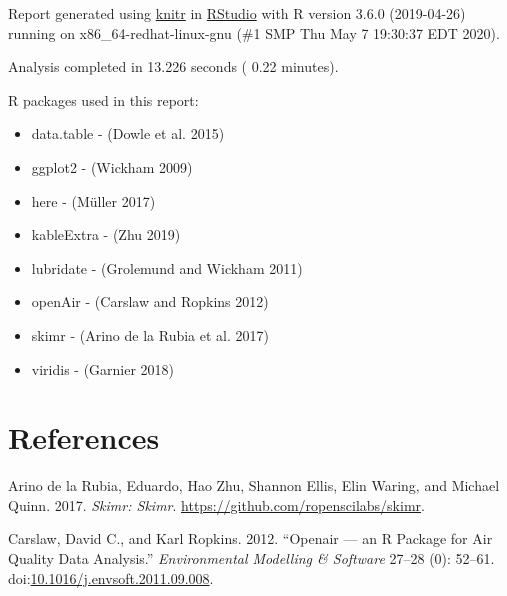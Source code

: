 \documentclass[]{article}
\newenvironment{Shaded}{\begin{snugshade}}{\end{snugshade}}
\newcommand{\KeywordTok}[1]{\textcolor[rgb]{0.13,0.29,0.53}{\textbf{#1}}}
\newcommand{\DecValTok}[1]{\textcolor[rgb]{0.00,0.00,0.81}{#1}}
\newcommand{\StringTok}[1]{\textcolor[rgb]{0.31,0.60,0.02}{#1}}
\newcommand{\OperatorTok}[1]{\textcolor[rgb]{0.81,0.36,0.00}{\textbf{#1}}}
\newcommand{\NormalTok}[1]{#1}
\providecommand{\tightlist}{%
  \setlength{\itemsep}{0pt}\setlength{\parskip}{0pt}}
\begin{document}
Report generated using
\href{https://cran.r-project.org/package=knitr}{knitr} in
\href{http://www.rstudio.com}{RStudio} with R version 3.6.0 (2019-04-26)
running on x86\_64-redhat-linux-gnu (\#1 SMP Thu May 7 19:30:37 EDT
2020).

\begin{Shaded}
\end{Shaded}

Analysis completed in 13.226 seconds ( 0.22 minutes).

R packages used in this report:

\begin{itemize}
\tightlist
\item
  data.table - (Dowle et al. 2015)
\item
  ggplot2 - (Wickham 2009)
\item
  here - (Müller 2017)
\item
  kableExtra - (Zhu 2019)
\item
  lubridate - (Grolemund and Wickham 2011)
\item
  openAir - (Carslaw and Ropkins 2012)
\item
  skimr - (Arino de la Rubia et al. 2017)
\item
  viridis - (Garnier 2018)
\end{itemize}

\section*{References}\label{references}

\hypertarget{refs}{}
\hypertarget{ref-skimr}{}
Arino de la Rubia, Eduardo, Hao Zhu, Shannon Ellis, Elin Waring, and
Michael Quinn. 2017. \emph{Skimr: Skimr}.
\url{https://github.com/ropenscilabs/skimr}.

\hypertarget{ref-openair}{}
Carslaw, David C., and Karl Ropkins. 2012. ``Openair --- an R Package
for Air Quality Data Analysis.'' \emph{Environmental Modelling \&
Software} 27--28 (0): 52--61.
doi:\href{https://doi.org/10.1016/j.envsoft.2011.09.008}{10.1016/j.envsoft.2011.09.008}.
\end{document}
